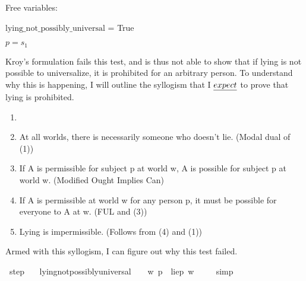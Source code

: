 \begin{isabellebody}
{  Free variables:

    $\text{lying\_not\_possibly\_universal}$ = True

    $p = s_1$ \color{black}%
}%
\endisatagproof
{\isafoldproof}%
%
\isadelimproof
%
\endisadelimproof
%
\begin{isamarkuptext}%
Kroy's formulation fails this test, and is thus not able to show that if lying is not possible 
      to universalize, it is prohibited for an arbitrary person. To understand why this is happening, I 
      will outline the syllogism that I $\emph{expect}$ to prove that lying is prohibited.%
\end{isamarkuptext}\isamarkuptrue%
%
\begin{enumerate}
        \item {}
        \item At all worlds, there is necessarily someone who doesn't lie. (Modal dual of (1))
        \item If A is permissible for subject p at world w, A is possible for subject p at world w. (Modified Ought Implies Can)
        \item If A is permissible at world w for any person p, it must be possible for everyone to A at w. (FUL and (3)) 
        \item Lying is impermissible. (Follows from (4) and (1)) \end{enumerate}
%
\begin{isamarkuptext}%
Armed with this syllogism, I can figure out why this test failed.%
\end{isamarkuptext}\isamarkuptrue%
\isamarkupfalse%
\ step{}{\isacharcolon}\isanewline
\ \ \ {\isachardoublequoteopen}lying{\isacharunderscore}not{\isacharunderscore}possibly{\isacharunderscore}universal\ {\isasymlongrightarrow}\ {\isasymTurnstile}{\isacharparenleft}\ {\isacharparenleft}{\isasymbox}\ {\isacharparenleft}{\isasymlambda}w{\isachardot}\ {\isasymexists}p{\isachardot}\ {\isacharparenleft}\isactrlbold {\isasymnot}\ {\isacharparenleft}lie{\isacharparenleft}p{\isacharparenright}{\isacharparenright}\ w{\isacharparenright}{\isacharparenright}{\isacharparenright}{\isacharparenright}\ {\isachardoublequoteclose}\isanewline
%
\isadelimproof
\ \ %
\endisadelimproof
%
\isatagproof
{}\isamarkupfalse%
\ simp\isanewline
%
%
\endisatagproof
{\isafoldproof}%
%
\isadelimproof
\isanewline

\end{isabellebody}
